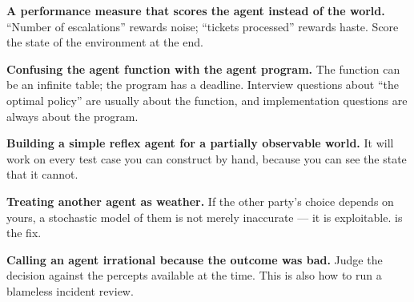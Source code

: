 \begin{pitfall}
\begin{tight}
  \item \textbf{A performance measure that scores the agent instead of the world.}
        ``Number of escalations'' rewards noise; ``tickets processed'' rewards
        haste. Score the state of the environment at the end.
  \item \textbf{Confusing the agent function with the agent program.} The function
        can be an infinite table; the program has a deadline. Interview questions
        about ``the optimal policy'' are usually about the function, and
        implementation questions are always about the program.
  \item \textbf{Building a simple reflex agent for a partially observable world.}
        It will work on every test case you can construct by hand, because you can
        see the state that it cannot.
  \item \textbf{Treating another agent as weather.} If the other party's choice
        depends on yours, a stochastic model of them is not merely inaccurate --- it
        is exploitable.  is the fix.
  \item \textbf{Calling an agent irrational because the outcome was bad.} Judge the
        decision against the percepts available at the time. This is also how to
        run a blameless incident review.
\end{tight}
\end{pitfall}

